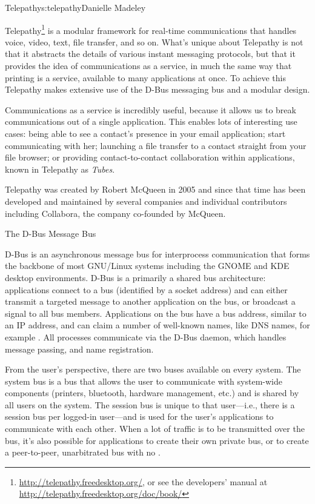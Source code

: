 \begin{aosachapter}{Telepathy}{s:telepathy}{Danielle Madeley}

Telepathy\footnote{\url{http://telepathy.freedesktop.org/}, or see the
developers' manual at \url{http://telepathy.freedesktop.org/doc/book/}} is a
modular framework for real-time communications that handles voice, video, text, file
transfer, and so on. What's unique about Telepathy is not that it abstracts the
details of various instant messaging protocols, but that it provides the idea
of communications as a service, in much the same way that printing is a
service, available to many applications at once. To achieve this Telepathy
makes extensive use of the D-Bus messaging bus and a modular design.

Communications as a service is incredibly useful, because it allows us
to break communications out of a single application. This enables lots
of interesting use cases: being able to see a contact's
presence in your email application; start communicating with
her; launching a file transfer to a contact straight from your file
browser; or providing contact-to-contact collaboration within
applications, known in Telepathy as \emph{Tubes}.

Telepathy was created by Robert McQueen in 2005 and since that time
has been developed and maintained by several companies and individual
contributors including Collabora, the company co-founded by McQueen.

\begin{aosabox}{The D-Bus Message Bus}

D-Bus is an asynchronous message bus for interprocess communication
that forms the backbone of most GNU/Linux systems including the GNOME
and KDE desktop environments.  D-Bus is a primarily a shared bus
architecture: applications connect to a bus (identified by a socket
address) and can either transmit a targeted message to another
application on the bus, or broadcast a signal to all bus
members. Applications on the bus have a bus address, similar to an IP
address, and can claim a number of well-known names, like DNS names,
for example .  All
processes communicate via the D-Bus daemon, which handles message
passing, and name registration.

From the user's perspective, there are two buses available on every
system.  The system bus is a bus that allows the user to communicate
with system-wide components (printers, bluetooth, hardware management,
etc.)  and is shared by all users on the system.  The session bus is
unique to that user---i.e., there is a session bus per logged-in
user---and is used for the user's applications to communicate with
each other.  When a lot of traffic is to be transmitted over the bus,
it's also possible for applications to create their own private bus,
or to create a peer-to-peer, unarbitrated bus with no
.


\end{aosabox}
\end{aosachapter}
